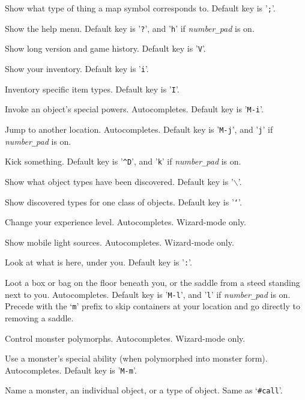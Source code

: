 Show what type of thing a map symbol corresponds to. Default key is '{\tt ;}'.
\item[\tb{\#help}]
Show the help menu. Default key is '{\tt ?}', and '{\tt h}' if {\it number\verb+_+pad\/} is on.
\item[\tb{\#history}]
Show long version and game history. Default key is '{\tt V}'.
\item[\tb{\#inventory}]
Show your inventory. Default key is '{\tt i}'.
\item[\tb{\#inventtype}]
Inventory specific item types. Default key is '{\tt I}'.
\item[\tb{\#invoke}]
Invoke an object's special powers. Autocompletes. Default key is '{\tt M-i}'.
\item[\tb{\#jump}]
Jump to another location. Autocompletes. Default key is '{\tt M-j}', and '{\tt j}' if {\it number\verb+_+pad\/} is on.
\item[\tb{\#kick}]
Kick something. Default key is '{\tt \^{}D}', and '{\tt k}' if {\it number\verb+_+pad\/} is on.
\item[\tb{\#known}]
Show what object types have been discovered. Default key is '{\tt $\backslash$}'.
\item[\tb{\#knownclass}]
Show discovered types for one class of objects. Default key is '{\tt `}'.
\item[\tb{\#levelchange}]
Change your experience level. Autocompletes. Wizard-mode only.
\item[\tb{\#lightsources}]
Show mobile light sources. Autocompletes. Wizard-mode only.
\item[\tb{\#look}]
Look at what is here, under you. Default key is '{\tt :}'.
\item[\tb{\#loot}]
Loot a box or bag on the floor beneath you, or the saddle 
from a steed standing next to you. Autocompletes.
Default key is '{\tt M-l}', and '{\tt l}' if {\it number\verb+_+pad\/} is on.
Precede with the `{\tt m}' prefix to skip containers at your location
and go directly to removing a saddle.
\item[\tb{\#monpolycontrol}]
Control monster polymorphs. Autocompletes. Wizard-mode only.
\item[\tb{\#monster}]
Use a monster's special ability (when polymorphed into monster form).
Autocompletes. Default key is '{\tt M-m}'.
\item[\tb{\#name}]
Name a monster, an individual object, or a type of object.  Same as `{\tt \#call}'.
